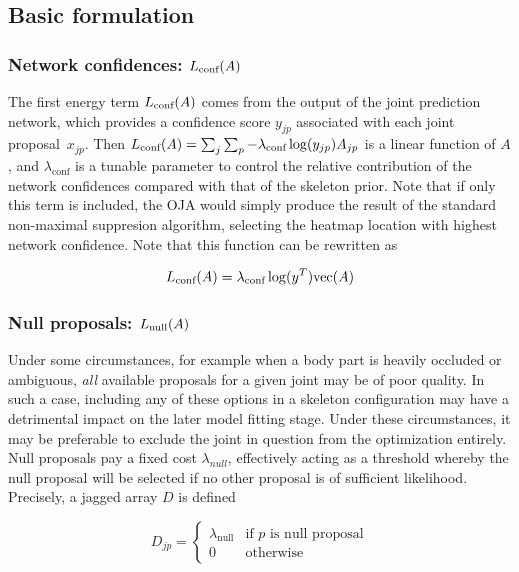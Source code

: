 \subsection{Basic formulation}

\subsubsection{Network confidences: $L_{\textrm{conf}}(A)$}

The first energy term $L_{\textrm{conf}}(A)$ comes from the output of the joint prediction network, which provides a confidence score $y_{jp}$ associated with each joint proposal~$x_{jp}$.  Then $L_{\textrm{conf}}(A) = \sum_j\sum_p -\lambda_{\text{conf}}\log(y_{jp}) A_{jp}$ is a linear function of $A$, 
and $\lambda_{\text{conf}}$ is a tunable parameter to control the relative contribution of the network confidences compared with that of the skeleton prior. Note that if only this term is included, the OJA would simply produce the result of the standard non-maximal suppresion algorithm, selecting the heatmap location with highest network confidence. Note that this function can be rewritten as

\begin{equation}\label{eq:conf-energy}
    L_{\textrm{conf}}(A) = \lambda_{\text{conf}}\log(y^T) \text{vec}(A)
\end{equation}

\subsubsection{Null proposals: $L_{\textrm{null}}(A)$}

Under some circumstances, for example when a body part is heavily occluded or ambiguous, \emph{all} available proposals for a given joint may be of poor quality. In such a case, including any of these options in a skeleton configuration may have a detrimental impact on the later model fitting stage. Under these circumstances, it may be preferable to exclude the joint in question from the optimization entirely. Null proposals pay a fixed cost $\lambda_{null}$, effectively acting as a threshold whereby the null proposal will be selected if no other proposal is of sufficient likelihood. Precisely, a jagged array $D$ is defined

\begin{equation}
    D_{jp} = \begin{cases}
        \lambda_{\text{null}} & \text{if } p \text{ is null proposal}\\
        0 & \text{otherwise}
    \end{cases}
\end{equation}

